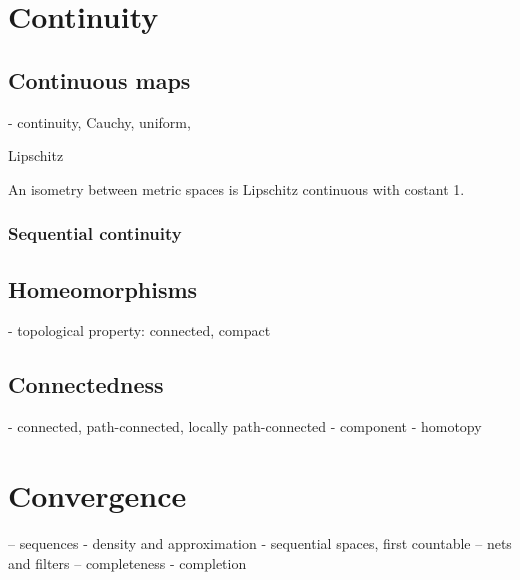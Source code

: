 \documentclass{../crs}
\begin{document}
\chapter{Continuity}


\section{Continuous maps}

- continuity, Cauchy, uniform, 

Lipschitz
\begin{ex}
An isometry between metric spaces is Lipschitz continuous with costant 1.
\end{ex}

\subsection{Sequential continuity}

\section{Homeomorphisms}
- topological property: connected, compact


\section{Connectedness}
- connected, path-connected, locally path-connected
- component
- homotopy













\chapter{Convergence}
-- sequences
- density and approximation
- sequential spaces, first countable
-- nets and filters
-- completeness
- completion
\end{document}
